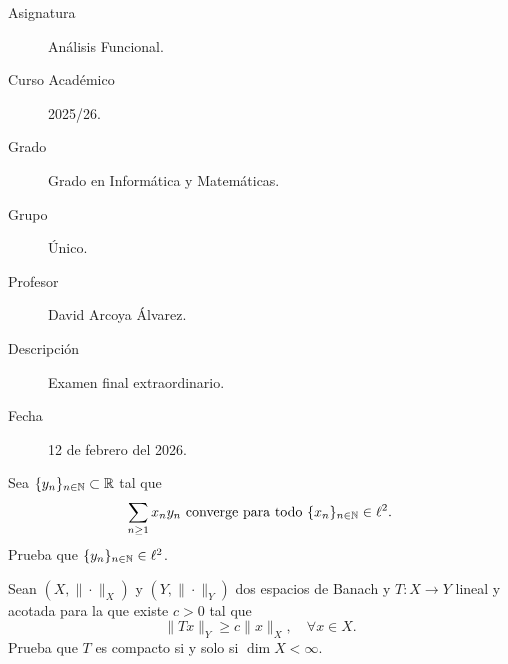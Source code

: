 \documentclass[12pt]{article}
\begin{document}

    
    

    \begin{description}
        \item[Asignatura] Análisis Funcional.
        \item[Curso Académico] 2025/26.
        \item[Grado] Grado en Informática y Matemáticas.
        \item[Grupo] Único.
        \item[Profesor] David Arcoya Álvarez.
        \item[Descripción] Examen final extraordinario.
        \item[Fecha] 12 de febrero del 2026.
    
    \end{description}
    \newpage


    
    \begin{ejercicio}[3 puntos]
        Sea $\{y_n\}_{n \in \mathbb{N}} \subset \mathbb{R}$ tal que
        \[ \sum_{n \geq 1} x_n y_n \text{ converge para todo } \{x_n\}_{n \in \mathbb{N}} \in \ell^2. \]
        Prueba que $\{y_n\}_{n \in \mathbb{N}} \in \ell^2$.
    \end{ejercicio}

    \begin{ejercicio}[3 puntos]
        Sean $(X, \|\cdot\|_X)$ y $(Y, \|\cdot\|_Y)$ dos espacios de Banach y $T : X \longrightarrow Y$ lineal y acotada para la que existe $c > 0$ tal que
        \[ \|Tx\|_Y \geq c\|x\|_X, \quad \forall x \in X. \]
        Prueba que $T$ es compacto si y solo si $\dim X < \infty$.
    \end{ejercicio}
\end{document}
